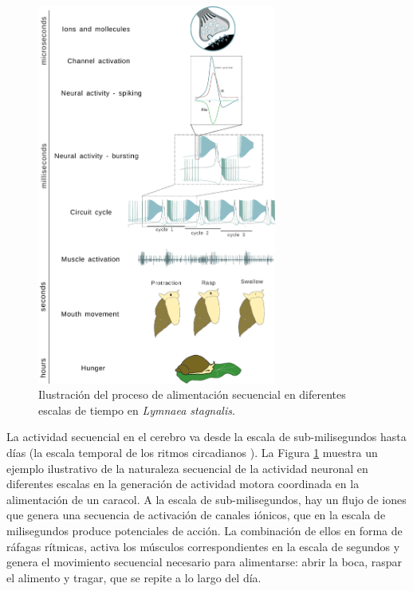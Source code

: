 \begin{figure}[hbt!]
	\centering
	\includegraphics[width=0.7\textwidth]{img/intro/time scale/time-scale-feeding.pdf}
	\caption{Ilustración del proceso de alimentación secuencial en diferentes escalas de tiempo en {\sl Lymnaea stagnalis}.}
	\label{fig:time-scale feeding spanish}
\end{figure}

La actividad secuencial en el cerebro va desde la escala de sub-milisegundos hasta días (la escala temporal de los ritmos circadianos \parencite{mauk_neural_2004}). La Figura \ref{fig:time-scale feeding spanish} muestra un ejemplo ilustrativo de la naturaleza secuencial de la actividad neuronal en diferentes escalas en la generación de actividad motora coordinada en la alimentación de un caracol. A la escala de sub-milisegundos, hay un flujo de iones que genera una secuencia de activación de canales iónicos, que en la escala de milisegundos produce potenciales de acción. La combinación de ellos en forma de ráfagas rítmicas, activa los músculos correspondientes en la escala de segundos y genera el movimiento secuencial necesario para alimentarse: abrir la boca, raspar el alimento y tragar, que se repite a lo largo del día.

